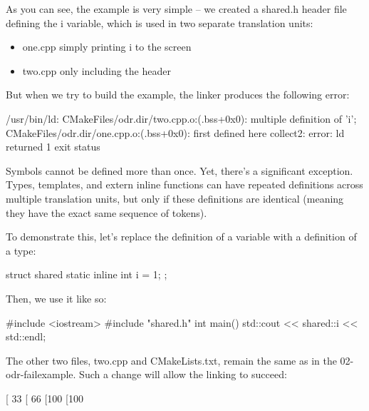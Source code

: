 As you can see, the example is very simple – we created a shared.h header file defining the i variable, which is used in two separate translation units:

\begin{itemize}
\item
one.cpp simply printing i to the screen

\item
two.cpp only including the header
\end{itemize}

But when we try to build the example, the linker produces the following error:

\begin{shell}
/usr/bin/ld:
CMakeFiles/odr.dir/two.cpp.o:(.bss+0x0): multiple definition of 'i';
CMakeFiles/odr.dir/one.cpp.o:(.bss+0x0): first defined here
collect2: error: ld returned 1 exit status
\end{shell}

Symbols cannot be defined more than once. Yet, there’s a significant exception. Types, templates, and extern inline functions can have repeated definitions across multiple translation units, but only if these definitions are identical (meaning they have the exact same sequence of tokens).

To demonstrate this, let’s replace the definition of a variable with a definition of a type:


\begin{cpp}
struct shared {
    static inline int i = 1;
};
\end{cpp}

Then, we use it like so:


\begin{cpp}
#include <iostream>
#include "shared.h"
int main() {
    std::cout << shared::i << std::endl;
}
\end{cpp}

The other two files, two.cpp and CMakeLists.txt, remain the same as in the 02-odr-failexample. Such a change will allow the linking to succeed:

\begin{shell}
[ 33%
[ 66%
[100%
[100%
\end{shell}

